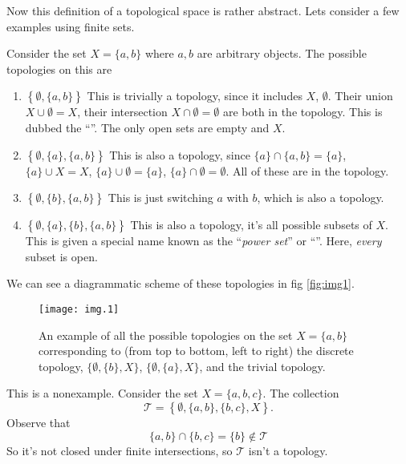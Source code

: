 Now this definition of a topological space is rather
abstract. Lets consider a few examples using finite sets.
\begin{ex}
Consider the set $X=\{a,b\}$ where $a,b$ are arbitrary
objects. The possible topologies on this are
\begin{enumerate}
\item $\left\{\emptyset,\{a,b\}\right\}$ This is trivially a
  topology, since it includes $X$, $\emptyset$. Their union
  $X\cup\emptyset=X$, their intersection
  $X\cap\emptyset=\emptyset$ are both in the topology. This is
  dubbed the ``''. The only open sets are
  empty and $X$.
\item $\left\{\emptyset,\{a\},\{a,b\}\right\}$ This is also a
  topology, since $\{a\}\cap\{a,b\}=\{a\}$, $\{a\}\cup X=X$,
  $\{a\}\cup\emptyset=\{a\}$, $\{a\}\cap\emptyset=\emptyset$. All
  of these are in the topology.
\item $\left\{\emptyset,\{b\},\{a,b\}\right\}$ This is just
  switching $a$ with $b$, which is also a topology.
\item $\left\{\emptyset,\{a\},\{b\},\{a,b\}\right\}$ This is also
  a topology, it's all possible subsets of $X$. This is given a
  special name known as the ``\emph{power set}'' or
  ``''. Here, \emph{every} subset is open.
\end{enumerate}  
We can see a diagrammatic scheme of these topologies in fig \eqref{fig:img1}.
\end{ex}

\begin{figure}[t]
\texttt{[image: img.1]}
\caption{An example of all the possible topologies on the set
  $X=\{a, b\}$ corresponding to (from top to bottom, left to right)
  the discrete topology, $\{\emptyset,\{b\},X\}$,
  $\{\emptyset,\{a\},X\}$, and the trivial topology.}\label{fig:img1}
\end{figure}

\begin{ex}
This is a nonexample. Consider the set $X=\{a,b,c\}$. The collection
\begin{equation}
\mathcal{T} = \left\{\emptyset,\{a,b\},\{b,c\},X\right\}.
\end{equation}
Observe that
\begin{equation}
\{a,b\}\cap\{b,c\}=\{b\}\notin\mathcal{T}
\end{equation}
So it's not closed under finite intersections, so $\mathcal{T}$
isn't a topology.
\end{ex}

